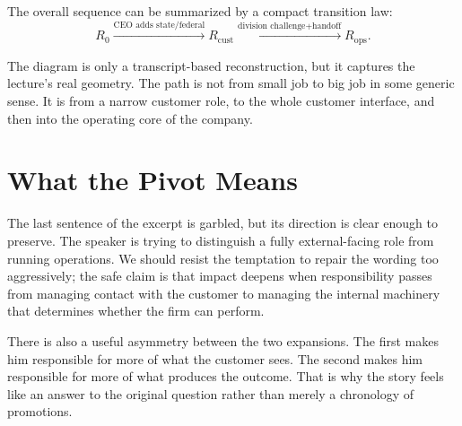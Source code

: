 The overall sequence can be summarized by a compact transition law:
\begin{equation}
R_0 \xrightarrow{\text{CEO adds state/federal}} R_{\mathrm{cust}}
\xrightarrow{\text{division challenge}+\text{handoff}} R_{\mathrm{ops}}.
\end{equation}

\begin{figure}
\begin{center}
\end{center}
\end{figure}

The diagram is only a transcript-based reconstruction, but it captures the lecture's real geometry. The path is not from small job to big job in some generic sense. It is from a narrow customer role, to the whole customer interface, and then into the operating core of the company.

\section{What the Pivot Means}

The last sentence of the excerpt is garbled, but its direction is clear enough to preserve. The speaker is trying to distinguish a fully external-facing role from running operations. We should resist the temptation to repair the wording too aggressively; the safe claim is that impact deepens when responsibility passes from managing contact with the customer to managing the internal machinery that determines whether the firm can perform.

There is also a useful asymmetry between the two expansions. The first makes him responsible for more of what the customer sees. The second makes him responsible for more of what produces the outcome. That is why the story feels like an answer to the original question rather than merely a chronology of promotions.


